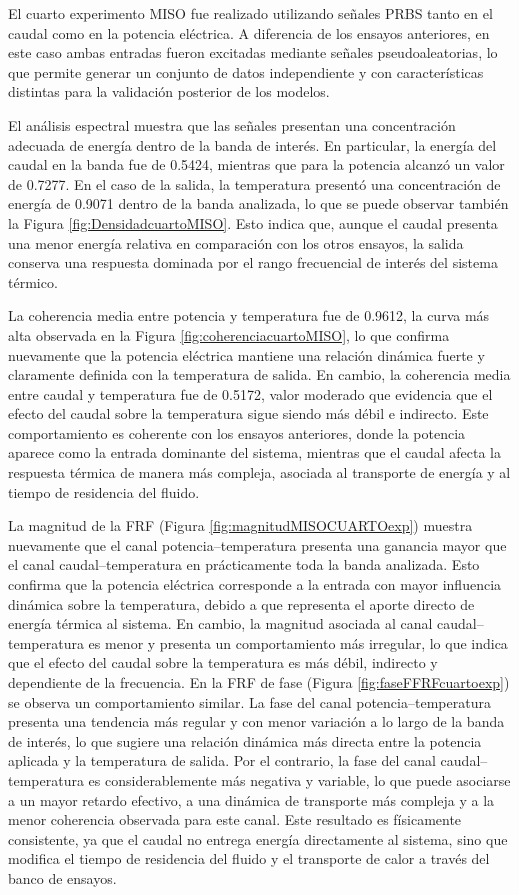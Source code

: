 \documentclass[11pt]{report}
\begin{document}
El cuarto experimento MISO fue realizado utilizando señales PRBS tanto en el caudal como en la potencia eléctrica. A diferencia de los ensayos anteriores, en este caso ambas entradas fueron excitadas mediante señales pseudoaleatorias, lo que permite generar un conjunto de datos independiente y con características distintas para la validación posterior de los modelos.

El análisis espectral muestra que las señales presentan una concentración adecuada de energía dentro de la banda de interés. En particular, la energía del caudal en la banda fue de 0.5424, mientras que para la potencia alcanzó un valor de 0.7277. En el caso de la salida, la temperatura presentó una concentración de energía de 0.9071 dentro de la banda analizada, lo que se puede observar también la Figura \ref{fig:DensidadcuartoMISO}. Esto indica que, aunque el caudal presenta una menor energía relativa en comparación con los otros ensayos, la salida conserva una respuesta dominada por el rango frecuencial de interés del sistema térmico.

La coherencia media entre potencia y temperatura fue de 0.9612, la curva más alta observada en la Figura \ref{fig:coherenciacuartoMISO}, lo que confirma nuevamente que la potencia eléctrica mantiene una relación dinámica fuerte y claramente definida con la temperatura de salida. En cambio, la coherencia media entre caudal y temperatura fue de 0.5172, valor moderado que evidencia que el efecto del caudal sobre la temperatura sigue siendo más débil e indirecto. Este comportamiento es coherente con los ensayos anteriores, donde la potencia aparece como la entrada dominante del sistema, mientras que el caudal afecta la respuesta térmica de manera más compleja, asociada al transporte de energía y al tiempo de residencia del fluido.

La magnitud de la FRF (Figura \ref{fig:magnitudMISOCUARTOexp}) muestra nuevamente que el canal potencia–temperatura presenta una ganancia mayor que el canal caudal–temperatura en prácticamente toda la banda analizada. Esto confirma que la potencia eléctrica corresponde a la entrada con mayor influencia dinámica sobre la temperatura, debido a que representa el aporte directo de energía térmica al sistema. En cambio, la magnitud asociada al canal caudal–temperatura es menor y presenta un comportamiento más irregular, lo que indica que el efecto del caudal sobre la temperatura es más débil, indirecto y dependiente de la frecuencia. En la FRF de fase (Figura \ref{fig:faseFFRFcuartoexp}) se observa un comportamiento similar. La fase del canal potencia–temperatura presenta una tendencia más regular y con menor variación a lo largo de la banda de interés, lo que sugiere una relación dinámica más directa entre la potencia aplicada y la temperatura de salida. Por el contrario, la fase del canal caudal–temperatura es considerablemente más negativa y variable, lo que puede asociarse a un mayor retardo efectivo, a una dinámica de transporte más compleja y a la menor coherencia observada para este canal. Este resultado es físicamente consistente, ya que el caudal no entrega energía directamente al sistema, sino que modifica el tiempo de residencia del fluido y el transporte de calor a través del banco de ensayos.
\end{document}
